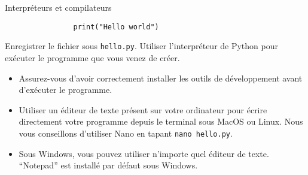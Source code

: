 \begin{section}{Interpréteurs et compilateurs}
\begin{Exercice}[10 minutes]
\begin{lstlisting}
                print("Hello world")\end{lstlisting}
        Enregistrer le fichier sous \lstinline{hello.py}. Utiliser l'interpréteur de Python pour exécuter le programme que vous venez de créer.
    \end{Exercice}
    \begin{conseil}
        \begin{itemize}
            \item Assurez-vous d'avoir correctement installer les outils de développement avant d'exécuter le programme.
            \item Utiliser un éditeur de texte présent sur votre ordinateur pour écrire directement votre programme depuis le terminal sous MacOS ou Linux. Nous vous conseillons d'utiliser Nano en tapant \lstinline{nano hello.py}.
            \item Sous Windows, vous pouvez utiliser n'importe quel éditeur de texte. ``Notepad'' est installé par défaut sous Windows.
        \end{itemize}
    \end{conseil}    

\end{section}

